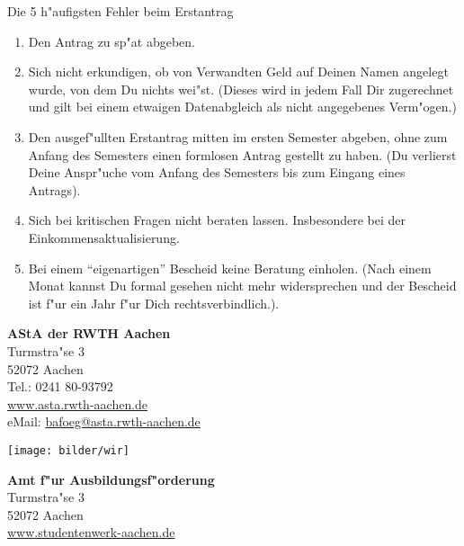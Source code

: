 \begin{artikel}{Die 5 h"aufigsten Fehler beim Erstantrag}
\noindent
\begin{enumerate}
\setlength{\parsep}{0mm}
\setlength{\itemsep}{0ex}
\setlength{\leftmargin}{-2ex}

\item  Den Antrag zu sp"at abgeben.
\item Sich nicht erkundigen, ob von Verwandten Geld auf Deinen Namen angelegt wurde, von dem Du nichts wei"st. (Dieses wird in jedem Fall Dir zugerechnet und gilt bei einem etwaigen Datenabgleich als nicht angegebenes Verm"ogen.)
\item Den ausgef"ullten Erstantrag mitten im ersten Semester abgeben, ohne zum Anfang des Semesters einen formlosen Antrag gestellt zu haben. (Du verlierst Deine Anspr"uche vom Anfang des Semesters bis zum Eingang eines Antrags).
\item Sich bei kritischen Fragen nicht beraten lassen. Insbesondere bei der Einkommensaktualisierung.
\item Bei einem "`eigenartigen"' Bescheid keine Beratung einholen. (Nach einem Monat kannst Du formal gesehen nicht mehr widersprechen und der Bescheid ist f"ur ein Jahr f"ur Dich rechtsverbindlich.). 
\end{enumerate}

{
\vspace*{-.5ex}

\textbf{AStA der RWTH Aachen}\\
Turmstra"se 3\\
52072 Aachen\\
Tel.: 0241 80-93792\\
\url{www.asta.rwth-aachen.de}\\
eMail: \url{bafoeg@asta.rwth-aachen.de}
\vspace*{1ex}

\centerline{\texttt{[image: bilder/wir]}}
\vspace*{1ex}

\textbf{Amt f"ur Ausbildungsf"orderung}\\
Turmstra"se 3\\
52072 Aachen\\
\url{www.studentenwerk-aachen.de}
}
\end{artikel}
